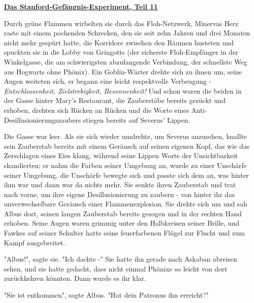 

\hypertarget{das-stanford-gefuxe4ngnis-experiment-teil-11}{%

\textbf{\uline{Das Stanford-Gefängnis-Experiment, Teil 11}}

Durch grüne Flammen wirbelten sie durch das Floh-Netzwerk, Minervas Herz raste mit einem pochenden Schrecken, den sie seit zehn Jahren und drei Monaten nicht mehr gespürt hatte, die Korridore zwischen den Räumen husteten und spuckten sie in die Lobby von Gringotts (der sicherste Floh-Empfänger in der Winkelgasse, die am schwierigsten abzufangende Verbindung, der schnellste Weg aus Hogwarts ohne Phönix). Ein Goblin-Wärter drehte sich zu ihnen um, seine Augen weiteten sich, er begann eine leicht respektvolle Verbeugung - \emph{Entschlossenheit, Zielstrebigkeit, Besonnenheit!} Und schon waren die beiden in der Gasse hinter Mary's Restaurant, die Zauberstäbe bereits gezückt und erhoben, drehten sich Rücken an Rücken und die Worte eines Anti-Desillusionierungszaubers stiegen bereits auf Severus' Lippen.

Die Gasse war leer. Als sie sich wieder umdrehte, um Severus anzusehen, knallte sein Zauberstab bereits mit einem Geräusch auf seinen eigenen Kopf, das wie das Zerschlagen eines Eies klang, während seine Lippen Worte der Unsichtbarkeit skandierten; er nahm die Farben seiner Umgebung an, wurde zu einer Unschärfe seiner Umgebung, die Unschärfe bewegte sich und passte sich dem an, was hinter ihm war und dann war da nichts mehr. Sie senkte ihren Zauberstab und trat nach vorne, um ihre eigene Desillusionierung zu zaubern - von hinter ihr das unverwechselbare Geräusch einer Flammenexplosion. Sie drehte sich um und sah Albus dort, seinen langen Zauberstab bereits gezogen und in der rechten Hand erhoben. Seine Augen waren grimmig unter den Halbkreisen seiner Brille, und Fawkes auf seiner Schulter hatte seine feuerfarbenen Flügel zur Flucht und zum Kampf ausgebreitet.

"Albus!", sagte sie. "Ich dachte -" Sie hatte ihn gerade nach Askaban abreisen sehen, und sie hatte gedacht, dass nicht einmal Phönixe so leicht von dort zurückkehren könnten. Dann wurde es ihr klar.

"Sie ist entkommen", sagte Albus. "Hat dein Patronus ihn erreicht?"

}
